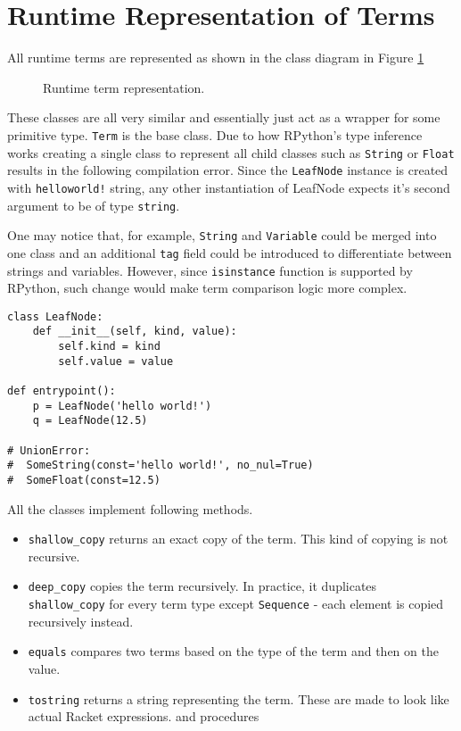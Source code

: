 \section{Runtime Representation of Terms}
\label{section:runtime-terms}

All runtime terms are represented as shown in the class diagram in Figure \ref{class-diagram-runtime-term}

\begin{figure}[H]
	\centering
\caption{Runtime term representation.}
\label{class-diagram-runtime-term}
\end{figure}

These classes are all very similar and essentially just act as a wrapper for some primitive type. \texttt{Term} is the base class. Due to how RPython's type inference works creating a single class to represent all child classes such as \texttt{String} or \texttt{Float} results in the following compilation error.  Since the \texttt{LeafNode} instance is created with \texttt{helloworld!} string, any other instantiation of LeafNode expects it's second argument to be of type \texttt{string}. 

One may notice that, for example, \texttt{String} and \texttt{Variable} could be merged into one class and an additional \texttt{tag} field could be introduced to differentiate between strings and variables. However, since \texttt{isinstance} function is supported by RPython, such change would make term comparison logic more complex.

\begin{verbatim}
class LeafNode:
    def __init__(self, kind, value):
        self.kind = kind 
        self.value = value

def entrypoint():
    p = LeafNode('hello world!')
    q = LeafNode(12.5)

# UnionError:
#  SomeString(const='hello world!', no_nul=True)
#  SomeFloat(const=12.5)
\end{verbatim}

All the classes implement following methods.
\begin{itemize}
\item \texttt{shallow\_copy} returns an exact copy of the term. This kind of copying is not recursive.
\item
\texttt{deep\_copy} copies the term recursively. In practice, it duplicates \texttt{shallow\_copy} for every term type except \texttt{Sequence} - each element is copied recursively instead.
\item
\texttt{equals} compares two terms based on the type of the term and then on the value.
\item
\texttt{tostring} returns a string representing the term. These are made to look like actual Racket expressions.
and procedures
\end{itemize}
 
